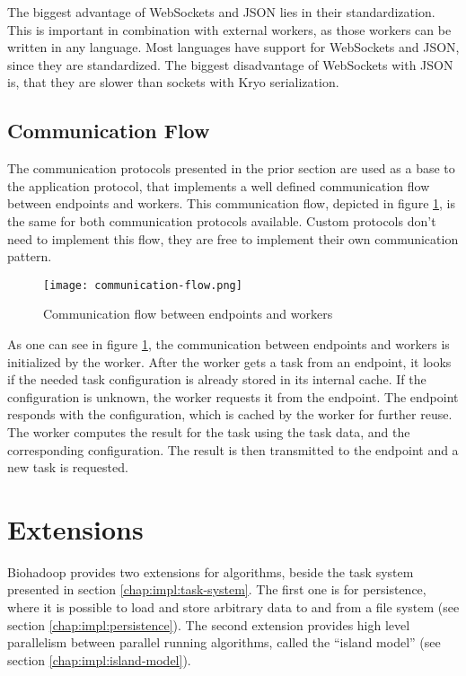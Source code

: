 The biggest advantage of WebSockets and JSON lies in their standardization. This is important in combination with external workers, as those workers can be written in any language. Most languages have support for WebSockets and JSON, since they are standardized. The biggest disadvantage of WebSockets with JSON is, that they are slower than sockets with Kryo serialization.

\subsection{Communication Flow}
\label{chap:impl:communication-flow}
The communication protocols presented in the prior section are used as a base to the application protocol, that implements a well defined communication flow between endpoints and workers. This communication flow, depicted in figure \ref{fig:communication-flow}, is the same for both communication protocols available. Custom protocols don't need to implement this flow, they are free to implement their own communication pattern.

\begin{figure}
  \centering
  \texttt{[image: communication-flow.png]}
  \caption[Communication flow between endpoints and workers]{Communication flow between endpoints and workers}
  \label{fig:communication-flow}
\end{figure}

As one can see in figure \ref{fig:communication-flow}, the communication between endpoints and workers is initialized by the worker. After the worker gets a task from an endpoint, it looks if the needed task configuration is already stored in its internal cache. If the configuration is unknown, the worker requests it from the endpoint. The endpoint responds with the configuration, which is cached by the worker for further reuse. The worker computes the result for the task using the task data, and the corresponding configuration. The result is then transmitted to the endpoint and a new task is requested.

\section{Extensions}
\label{chap:impl:extensions}
Biohadoop provides two extensions for algorithms, beside the task system presented in section \ref{chap:impl:task-system}. The first one is for persistence, where it is possible to load and store arbitrary data to and from a file system (see section \ref{chap:impl:persistence}). The second extension provides high level parallelism between parallel running algorithms, called the ``island model'' (see section \ref{chap:impl:island-model}).

